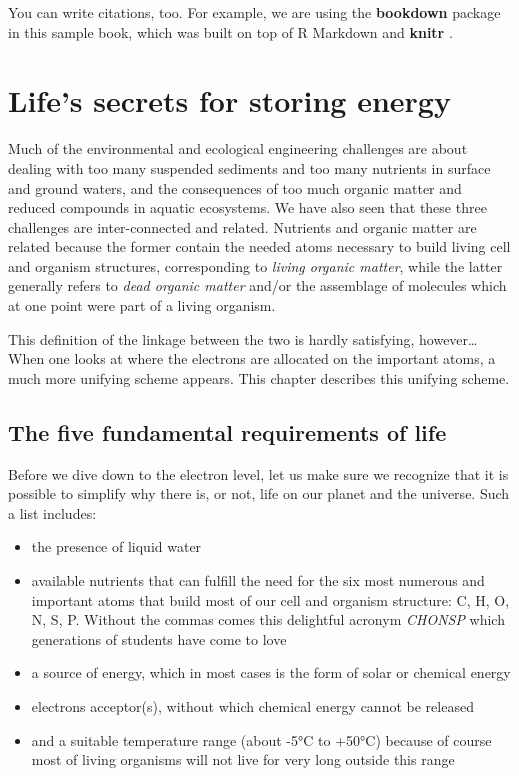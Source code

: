 \documentclass[]{book}
\providecommand{\tightlist}{%
  \setlength{\itemsep}{0pt}\setlength{\parskip}{0pt}}
\theoremstyle{definition}
\theoremstyle{definition}
\theoremstyle{definition}
\theoremstyle{remark}
\begin{document}
You can write citations, too. For example, we are using the
\textbf{bookdown} package \citep{R-bookdown} in this sample book, which
was built on top of R Markdown and \textbf{knitr} \citep{xie2015}.

\chapter{Life's secrets for storing
energy}\label{lifes-secrets-for-storing-energy}

Much of the environmental and ecological engineering challenges are
about dealing with too many suspended sediments and too many nutrients
in surface and ground waters, and the consequences of too much organic
matter and reduced compounds in aquatic ecosystems. We have also seen
that these three challenges are inter-connected and related. Nutrients
and organic matter are related because the former contain the needed
atoms necessary to build living cell and organism structures,
corresponding to \emph{living organic matter}, while the latter
generally refers to \emph{dead organic matter} and/or the assemblage of
molecules which at one point were part of a living organism.

This definition of the linkage between the two is hardly satisfying,
however\ldots{} When one looks at where the electrons are allocated on
the important atoms, a much more unifying scheme appears. This chapter
describes this unifying scheme.

\section{The five fundamental requirements of
life}\label{the-five-fundamental-requirements-of-life}

Before we dive down to the electron level, let us make sure we recognize
that it is possible to simplify why there is, or not, life on our planet
and the universe. Such a list includes:

\begin{itemize}
\tightlist
\item
  the presence of liquid water
\item
  available nutrients that can fulfill the need for the six most
  numerous and important atoms that build most of our cell and organism
  structure: C, H, O, N, S, P. Without the commas comes this delightful
  acronym \emph{CHONSP} which generations of students have come to love
\item
  a source of energy, which in most cases is the form of solar or
  chemical energy
\item
  electrons acceptor(s), without which chemical energy cannot be
  released
\item
  and a suitable temperature range (about -5°C to +50°C) because of
  course most of living organisms will not live for very long outside
  this range
\end{itemize}
\end{document}
